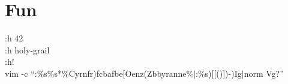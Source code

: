 \section{Fun}
 :h 42\\
 :h holy-grail\\
 :h!\\
 vim -c ``:\%s\%s*\%Cyrnfr)fcbafbe[Oenz(Zbbyranne\%$|$:\%s)[[()])-)Ig$|$norm Vg?''
